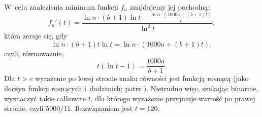 W~celu znalezienia minimum funkcji $f_n$ znajdujemy jej pochodną:
\[
	f_n'(t) = \frac{\ln n\cdot(b+1)\ln t-\frac{\ln n\cdot(1000a+(b+1)t)}{t}}{\ln^2t},
\]
która zeruje się, gdy
\[
	\ln n\cdot(b+1)t\ln t = \ln n\cdot(1000a+(b+1)t),
\]
czyli, równoważnie,
\[
	t(\ln t-1) = \frac{1000a}{b+1}.
\]
Dla $t>e$ wyrażenie po lewej stronie znaku równości jest funkcją rosnącą (jako iloczyn funkcji rosnących i~dodatnich; patrz ).
Nietrudno więc, szukając binarnie, wyznaczyć takie całkowite $t$, dla którego wyrażenie przyjmuje wartość po prawej stronie, czyli $5000/11$.
Rozwiązaniem jest $t=120$.
